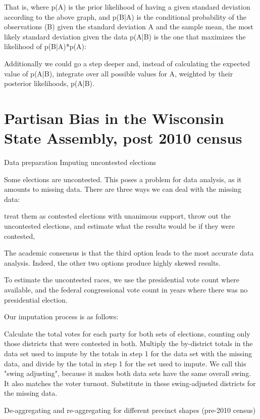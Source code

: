 \documentclass[preprint,12pt]{article}
\begin{document}
That is, where p(A) is the prior likelihood of having a given standard deviation according to the above graph, and p(B|A) is the conditional probability of the observations (B) given the standard deviation A and the sample mean, the most likely standard deviation given the data p(A|B) is the one that maximizes the likelihood of p(B|A)*p(A): 
 

 
Additionally we could go a step deeper and, instead of calculating the expected value of p(A|B), integrate over all possible values for A, weighted by their posterior likelihoods, p(A|B).


\section{Partisan Bias in the Wisconsin State Assembly, post 2010 census\label{sec:Wis}}

Data preparation
Imputing uncontested elections
 
Some elections are uncontested.   This poses a problem for data analysis, as it amounts to missing data.  There are three ways we can deal with the missing data: 
 
treat them as contested elections with unanimous support, 
throw out the uncontested elections, and 
estimate what the results would be if they were contested, 
 
The academic consensus is that the third option leads to the most accurate data analysis.  Indeed, the other two options produce highly skewed results.
 
To estimate the uncontested races, we use the presidential vote count where available, and the federal congressional vote count in years where there was no presidential election.
 
Our imputation process is as follows:
 
Calculate the total votes for each party for both sets of elections, counting only those districts that were contested in both.
Multiply the by-district totals in the data set used to impute by the totals in step 1 for the data set with the missing data, and divide by the total in step 1 for the set used to impute.  We call this "swing adjusting", because it makes both data sets have the same overall swing.  It also matches the voter turnout.
Substitute in these swing-adjusted districts for the missing data.
 
De-aggregating and re-aggregating for different precinct shapes (pre-2010 census)
 
\end{document}
